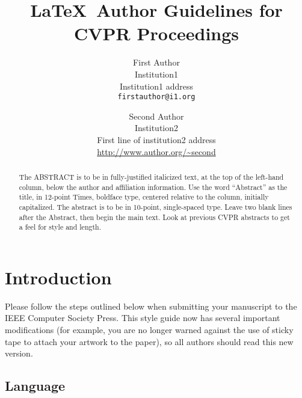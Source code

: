 \documentclass[10pt,twocolumn,letterpaper]{article}
\begin{document}
\title{\LaTeX\ Author Guidelines for CVPR Proceedings}

\author{First Author\\
Institution1\\
Institution1 address\\
{\tt\small firstauthor@i1.org}
\and
Second Author\\
Institution2\\
First line of institution2 address\\
{\small\url{http://www.author.org/~second}}
}

\maketitle
\thispagestyle{empty}

\begin{abstract}
   The ABSTRACT is to be in fully-justified italicized text, at the top
   of the left-hand column, below the author and affiliation
   information. Use the word ``Abstract'' as the title, in 12-point
   Times, boldface type, centered relative to the column, initially
   capitalized. The abstract is to be in 10-point, single-spaced type.
   Leave two blank lines after the Abstract, then begin the main text.
   Look at previous CVPR abstracts to get a feel for style and length.
\end{abstract}

\section{Introduction}

Please follow the steps outlined below when submitting your manuscript to
the IEEE Computer Society Press.  This style guide now has several
important modifications (for example, you are no longer warned against the
use of sticky tape to attach your artwork to the paper), so all authors
should read this new version.

\subsection{Language}
\end{document}
